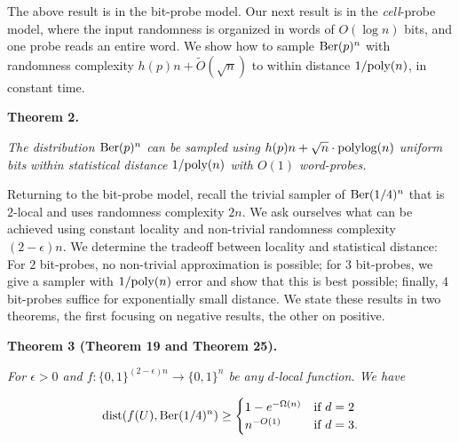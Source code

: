 The above result is in the bit-probe model. Our next result is in the \emph{cell}-probe model, where the input randomness is organized in words of $O(\log n)$ bits, and one probe reads an entire word. We show how to sample $\textnormal{Ber}(p)^{n}$ with randomness complexity $h(p)n+\widetilde{O}({\sqrt{n}})$ to within distance $1/\textnormal{poly}(n)$, in constant time.\par





\par\medskip\noindent\textbf{
\textbf{Theorem 2}\textbf{.}
}\par



\emph{The distribution $\textnormal{Ber}(p)^{n}$ can be sampled using $h(p)n+\sqrt{n}\cdot\textnormal{polylog}(n)$ uniform bits within statistical distance $1/\textnormal{poly}(n)$ with $O(1)$ word-probes.}\par






Returning to the bit-probe model, recall the trivial sampler of $\textnormal{Ber}(1/4)^{n}$ that is $2$-local and uses randomness complexity $2n$. We ask ourselves what can be achieved using constant locality and non-trivial randomness complexity $(2-\epsilon)n$.
We determine the tradeoff between locality and statistical distance:
For $2$ bit-probes, no non-trivial approximation is possible; for 3 bit-probes, we give a sampler with $1/\textnormal{poly}(n)$ error and show that this is best possible; finally, 4 bit-probes suffice for exponentially small distance. We state these results in two theorems, the first focusing on negative results, the other on positive.\par





\par\medskip\noindent\textbf{
\textbf{Theorem 3}\textbf{ }(Theorem 19 and Theorem 25)\textbf{.}
}\par



\emph{For $\epsilon>0$ and $f\colon\{0,1\}^{(2-\epsilon)n}\to\{0,1\}^{n}$ be any $d$-local function.
We have}\par


\[\begin{gathered}
\mathrm{dist}(f(U),\textnormal{Ber}(1/4)^{n})\geq\begin{cases}1-e^{-\Omega(n)}&\text{if $d=2$}\\
n^{-O(1)}&\text{if $d=3$.}\end{cases}
\end{gathered}\]



